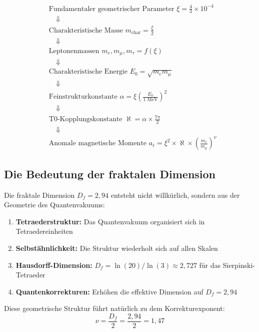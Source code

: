 \documentclass[12pt,a4paper]{article}
\begin{document}
		\begin{align}
			&\text{Fundamentaler geometrischer Parameter } \xi = \frac{4}{3} \times 10^{-4} \\
			&\quad \Downarrow \\
			&\text{Charakteristische Masse } m_{\text{char}} = \frac{\xi}{2} \\
			&\quad \Downarrow \\
			&\text{Leptonenmassen } m_e, m_\mu, m_\tau = f(\xi) \\
			&\quad \Downarrow \\
			&\text{Charakteristische Energie } E_0 = \sqrt{m_e m_\mu} \\
			&\quad \Downarrow \\
			&\text{Feinstrukturkonstante } \alpha = \xi \left(\frac{E_0}{1\text{ MeV}}\right)^2 \\
			&\quad \Downarrow \\
			&\text{T0-Kopplungskonstante } \aleph = \alpha \times \frac{7\pi}{2} \\
			&\quad \Downarrow \\
			&\text{Anomale magnetische Momente } a_\ell = \xi^2 \times \aleph \times \left(\frac{m_\ell}{m_\mu}\right)^\nu
		\end{align}
		
		\subsection{Die Bedeutung der fraktalen Dimension}
		
		Die fraktale Dimension $D_f = 2{,}94$ entsteht nicht willk\"urlich, sondern aus der Geometrie des Quantenvakuums:
		\begin{enumerate}
			\item \textbf{Tetraederstruktur:} Das Quantenvakuum organisiert sich in Tetraedereinheiten
			\item \textbf{Selbst\"ahnlichkeit:} Die Struktur wiederholt sich auf allen Skalen
			\item \textbf{Hausdorff-Dimension:} $D_f = \ln(20)/\ln(3) \approx 2{,}727$ f\"ur das Sierpinski-Tetraeder
			\item \textbf{Quantenkorrekturen:} Erh\"ohen die effektive Dimension auf $D_f = 2{,}94$
		\end{enumerate}
		
		Diese geometrische Struktur f\"uhrt nat\"urlich zu dem Korrekturexponent:
		\begin{equation}
			\nu = \frac{D_f}{2} = \frac{2{,}94}{2} = 1{,}47
		\end{equation}
		
\end{document}
